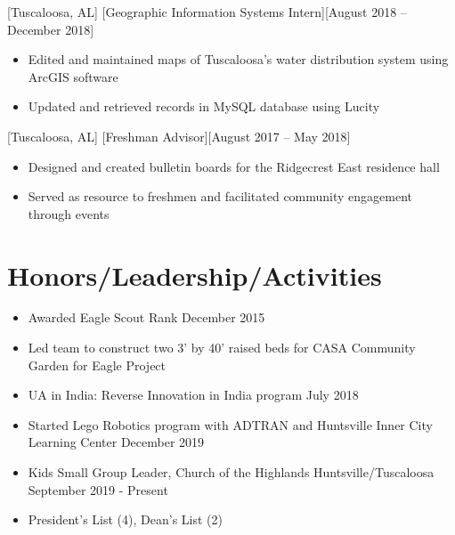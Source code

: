\documentclass[hidelinks, 11pt]{article}
\begin{document}
[Tuscaloosa, AL]
[Geographic Information Systems Intern][August 2018 – December 2018]

\begin{itemize}
  \item Edited and maintained maps of Tuscaloosa’s water distribution system using ArcGIS software
  \item Updated and retrieved records in MySQL database using Lucity
\end{itemize}\leavevmode

[Tuscaloosa, AL]
[Freshman Advisor][August 2017 – May 2018]

\begin{itemize}
  \item Designed and created bulletin boards for the Ridgecrest East residence hall
  \item Served as resource to freshmen and facilitated community engagement through events
\end{itemize}\leavevmode

\section{Honors/Leadership/Activities}

\begin{itemize}
  \item Awarded Eagle Scout Rank \hfill December 2015
  \item Led team to construct two 3' by 40' raised beds for CASA Community Garden for Eagle Project
  \item UA in India: Reverse Innovation in India program \hfill July 2018
  \item Started Lego Robotics program with ADTRAN and Huntsville Inner City Learning Center \hfill December 2019
  \item Kids Small Group Leader, Church of the Highlands Huntsville/Tuscaloosa \hfill September 2019 - Present
  \item President's List (4), Dean's List (2)
\end{itemize}
\end{document}
